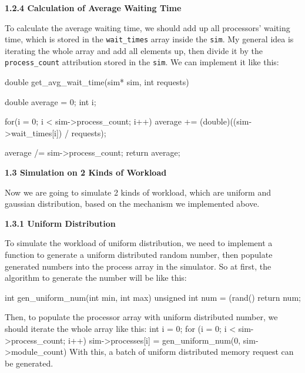 \documentclass{article}%
\newenvironment{code}%
   {\snugshade\verbatim}%
   {\endverbatim\endsnugshade}
\begin{document}
\begin{Large}
\begin{code}
\end{code}
\newpage
\begin{flushleft}
\textbf{1.2.4 Calculation of Average Waiting Time}
\end{flushleft}

To calculate the average waiting time, we should add up all processors' waiting time, which is stored in the \texttt{wait\_times} array inside the \texttt{sim}. My general idea is iterating the whole array and add all elements up, then divide it by the \texttt{process\_count} attribution stored in the \texttt{sim}. We can implement it like this:

\begin{code}
    double get_avg_wait_time(sim* sim, int requests) {
        double average = 0;
        int i;

        for(i = 0; i < sim->process_count; i++){
            average += (double)((sim->wait_times[i]) / requests); 
        }

        average /= sim->process_count;
        return average;
    }
\end{code}

\begin{LARGE}
\begin{flushleft}
\textbf{1.3 Simulation on 2 Kinds of Workload}
\end{flushleft}
\end{LARGE}

Now we are going to simulate 2 kinds of workload, which are uniform and gaussian distribution, based on the mechanism we implemented above.
\begin{flushleft}
\textbf{1.3.1 Uniform Distribution}
\end{flushleft}

To simulate the workload of uniform distribution, we need to implement a function to generate a uniform distributed random number, then populate generated numbers into the process array in the simulator. So at first, the algorithm to generate the number will be like this:

\begin{code}
    int gen_uniform_num(int min, int max){
        unsigned int num = (rand() %
        return num;
    }
\end{code}

Then, to populate the processor array with uniform distributed number, we should iterate the whole array like this:
\newpage
\begin{code}
    int i = 0;
    for (i = 0; i < sim->process_count; i++) {
        sim->processes[i] = gen_uniform_num(0, sim->module_count) 
    }
\end{code}
With this, a batch of uniform distributed memory request can be generated.


\end{Large}
\end{document}
